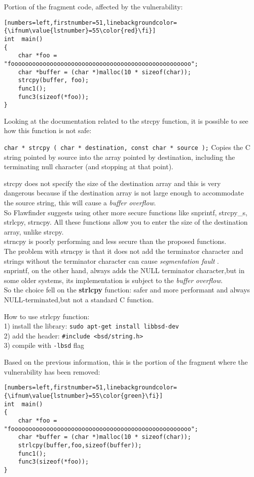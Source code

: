 \documentclass[a4paper,12pt]{article}
\newenvironment{SpecialPar}
  {\begin{shaded}}
  {\end{shaded}}
\begin{document}
Portion of the fragment code, affected by the vulnerability:
\begin{lstlisting}[style=c][numbers=left,firstnumber=51,linebackgroundcolor={\ifnum\value{lstnumber}=55\color{red}\fi}]
int  main()
{
	char *foo = "fooooooooooooooooooooooooooooooooooooooooooooooooooo";
	char *buffer = (char *)malloc(10 * sizeof(char));
	strcpy(buffer, foo);
	func1();
	func3(sizeof(*foo));
}
\end{lstlisting}
Looking at the documentation related to the strcpy function\cite{strcpy}, it is possible to see how this function is not safe:\\
\begin{SpecialPar}
\noindent
\texttt{char * strcpy ( char * destination, const char * source );}
Copies the C string pointed by source into the array 		pointed by destination, including the terminating null character (and stopping at that point).
\end{SpecialPar}
\noindent
strcpy does not specify the size of the destination array and this is very dangerous because if the destination array is not large enough to accommodate the source string, this will cause a \textit{buffer overflow}.\\
So Flawfinder suggests using other more secure functions like snprintf, strcpy\_s, strlcpy, strncpy.
All these functions allow you to enter the size of the destination array, unlike strcpy.\\
strncpy is poorly performing and less secure than the proposed functions.\\
The problem with strncpy is that it does not add the terminator character and strings without the terminator character can cause \textit{segmentation fault} \cite{geeksstrcpy}.\\
snprintf, on the other hand, always adds the NULL terminator character,but in some older systems, its implementation is subject to the \textit{buffer overflow}\cite{dangerc}.\\
So the choice fell on the \textbf{strlcpy} function: safer and more performant \cite{dangerc} and always NULL-terminated,but not a standard C function.\\


\begin{SpecialPar}

\noindent
How to use strlcpy function:\\
 1) install the library: \texttt{sudo apt-get install libbsd-dev}\\
 2) add the header: \texttt{\#include <bsd/string.h>}\\
 3) compile with \texttt{-lbsd} flag\\
\end{SpecialPar}
\noindent
Based on the previous information, this is the portion of the fragment where the vulnerability has been removed:
\begin{lstlisting}[style=c][numbers=left,firstnumber=51,linebackgroundcolor={\ifnum\value{lstnumber}=55\color{green}\fi}]
int  main()
{
	char *foo = "fooooooooooooooooooooooooooooooooooooooooooooooooooo";
	char *buffer = (char *)malloc(10 * sizeof(char));
	strlcpy(buffer,foo,sizeof(buffer));
	func1();
	func3(sizeof(*foo));
}
\end{lstlisting}
\end{document}
